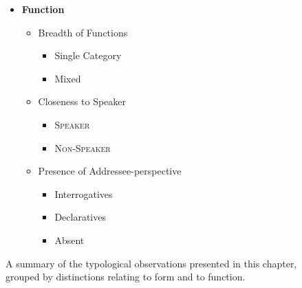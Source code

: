 \begin{figure}
\begin{multicols}{2}
                \columnbreak
        \begin{itemize}        
                \item[] \textbf{Function}
                \begin{itemize}
                        \item[] Breadth of Functions
                        \begin{itemize}
                                \item Single Category
                                \item Mixed 
                        \end{itemize}
                        \item[] Closeness to Speaker
                        \begin{itemize}
                                \item \textsc{Speaker}
                                \item \textsc{Non-Speaker}
                        \end{itemize}
                        \item[] Presence of Addressee-perspective
                        \begin{itemize}
                                \item Interrogatives
                                \item Declaratives
                                \item Absent
                        \end{itemize}
                \end{itemize}
        \end{itemize} 
\end{multicols}
        \caption{A summary of the typological observations presented in this chapter, grouped by distinctions relating to form and to function.}
\end{figure}

